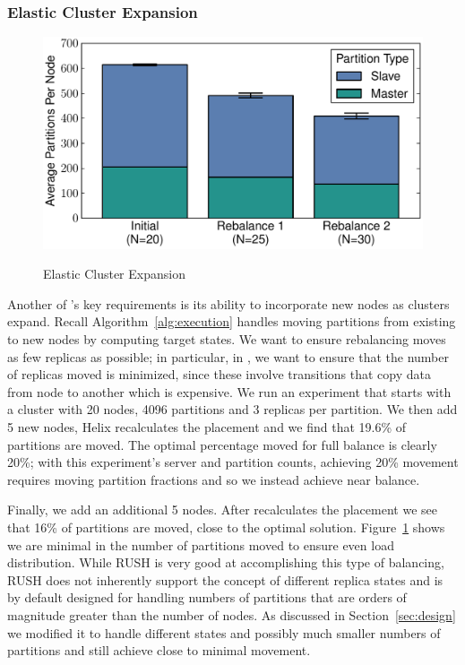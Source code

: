 \subsubsection{Elastic Cluster Expansion}
\label{sec:elastic}
%
\begin{figure}[t]
    {\includegraphics[width=\columnwidth]{rebalance.pdf}}
    \vspace*{-2ex}
    \caption{\label{fig:cluster_expansion} Elastic Cluster Expansion }
\end{figure}

Another of \helix's key requirements is its ability to incorporate new nodes as
clusters expand.  Recall Algorithm~\ref{alg:execution}
handles moving partitions from existing to new nodes by computing target
states. 
We want to ensure rebalancing moves as few replicas as possible; in
particular, in \ES, we want to ensure that the number of replicas moved is
minimized, since these involve transitions that copy data from node to another
which is expensive.
We run an experiment that starts with a cluster with 20 nodes,
4096 partitions and 3 replicas per partition. We then add 5 new nodes, Helix
recalculates the placement and we find that 19.6\% of partitions are moved.  The
optimal percentage moved for full balance is clearly 20\%; with this
experiment's server and partition counts, achieving 20\% movement requires
moving partition fractions and so we instead achieve near balance.

Finally, we add an additional 5 nodes. After \helix recalculates the
placement we see that 16\% of partitions are moved, close to the optimal
solution. 
Figure~\ref{fig:cluster_expansion} shows we are minimal in
the number of partitions moved to ensure even load distribution.
While RUSH is very good at accomplishing this type of balancing, RUSH does not inherently support the 
concept of different replica states and is by default
designed for handling numbers of partitions that are orders of magnitude greater
than the number of nodes.  As discussed in Section~\ref{sec:design} we modified it to handle different states and
possibly much smaller numbers of partitions and still achieve close to minimal
movement.

